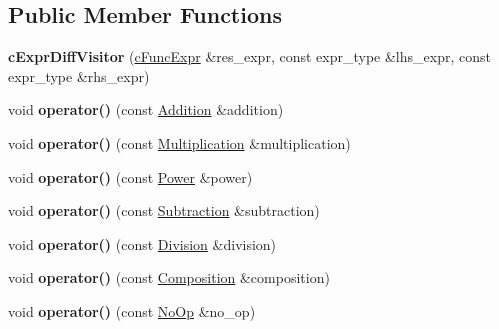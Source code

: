 \subsection*{Public Member Functions}
\begin{DoxyCompactItemize}
\item 
\hypertarget{classcExprDiffVisitor_a94afe65f0cfd3f370d3da012e8250a7f}{{\bfseries c\-Expr\-Diff\-Visitor} (\hyperlink{classcFuncExpr}{c\-Func\-Expr} \&res\-\_\-expr, const expr\-\_\-type \&lhs\-\_\-expr, const expr\-\_\-type \&rhs\-\_\-expr)}\label{classcExprDiffVisitor_a94afe65f0cfd3f370d3da012e8250a7f}

\item 
\hypertarget{classcExprDiffVisitor_a9fe2fb7ec0559e373f9b0cbba94a3552}{void {\bfseries operator()} (const \hyperlink{classAddition}{Addition} \&addition)}\label{classcExprDiffVisitor_a9fe2fb7ec0559e373f9b0cbba94a3552}

\item 
\hypertarget{classcExprDiffVisitor_a0e0c577ae4252f4a018edc9fde106941}{void {\bfseries operator()} (const \hyperlink{classMultiplication}{Multiplication} \&multiplication)}\label{classcExprDiffVisitor_a0e0c577ae4252f4a018edc9fde106941}

\item 
\hypertarget{classcExprDiffVisitor_a48e9d87ae1292715471a50185434b908}{void {\bfseries operator()} (const \hyperlink{classPower}{Power} \&power)}\label{classcExprDiffVisitor_a48e9d87ae1292715471a50185434b908}

\item 
\hypertarget{classcExprDiffVisitor_a6af75b96c9420f17cb39c512d3d5332f}{void {\bfseries operator()} (const \hyperlink{classSubtraction}{Subtraction} \&subtraction)}\label{classcExprDiffVisitor_a6af75b96c9420f17cb39c512d3d5332f}

\item 
\hypertarget{classcExprDiffVisitor_ada15b68409e61a90f025a3c3d89ea293}{void {\bfseries operator()} (const \hyperlink{classDivision}{Division} \&division)}\label{classcExprDiffVisitor_ada15b68409e61a90f025a3c3d89ea293}

\item 
\hypertarget{classcExprDiffVisitor_a4b229ee11763b655aafdef441897fa54}{void {\bfseries operator()} (const \hyperlink{classComposition}{Composition} \&composition)}\label{classcExprDiffVisitor_a4b229ee11763b655aafdef441897fa54}

\item 
\hypertarget{classcExprDiffVisitor_a2b681df9eed2f0e9532faeb4d7193f58}{void {\bfseries operator()} (const \hyperlink{structNoOp}{No\-Op} \&no\-\_\-op)}\label{classcExprDiffVisitor_a2b681df9eed2f0e9532faeb4d7193f58}

\end{DoxyCompactItemize}
